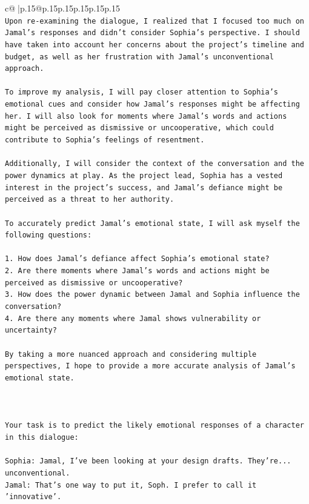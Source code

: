 \documentclass{article}
\begin{document}
{\begin{supertabular}{c@{$\;$}|p{.15\linewidth}@{}p{.15\linewidth}p{.15\linewidth}p{.15\linewidth}p{.15\linewidth}p{.15\linewidth}}
{{{\\ 
\texttt{Upon re{-}examining the dialogue, I realized that I focused too much on Jamal's responses and didn't consider Sophia's perspective. I should have taken into account her concerns about the project's timeline and budget, as well as her frustration with Jamal's unconventional approach. } \\
\\ 
\texttt{To improve my analysis, I will pay closer attention to Sophia's emotional cues and consider how Jamal's responses might be affecting her. I will also look for moments where Jamal's words and actions might be perceived as dismissive or uncooperative, which could contribute to Sophia's feelings of resentment. } \\
\\ 
\texttt{Additionally, I will consider the context of the conversation and the power dynamics at play. As the project lead, Sophia has a vested interest in the project's success, and Jamal's defiance might be perceived as a threat to her authority. } \\
\\ 
\texttt{To accurately predict Jamal's emotional state, I will ask myself the following questions:} \\
\\ 
\texttt{1. How does Jamal's defiance affect Sophia's emotional state?} \\
\texttt{2. Are there moments where Jamal's words and actions might be perceived as dismissive or uncooperative?} \\
\texttt{3. How does the power dynamic between Jamal and Sophia influence the conversation?} \\
\texttt{4. Are there any moments where Jamal shows vulnerability or uncertainty?} \\
\\ 
\texttt{By taking a more nuanced approach and considering multiple perspectives, I hope to provide a more accurate analysis of Jamal's emotional state.} \\
\\ 
\\ 
\\ 
\texttt{Your task is to predict the likely emotional responses of a character in this dialogue:} \\
\\ 
\texttt{Sophia: Jamal, I've been looking at your design drafts. They're... unconventional.} \\
\texttt{Jamal: That's one way to put it, Soph. I prefer to call it 'innovative'.} \\
}}}
\end{supertabular}}
\end{document}
